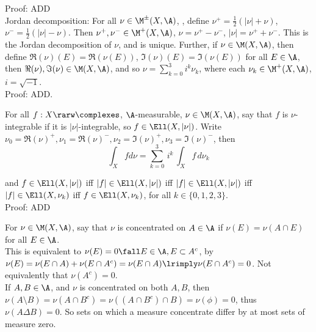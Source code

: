 \noindent
Proof: ADD \\

Jordan decomposition: For all $ \nu \in \M^\pm(X, \A)$, , define $\nu^+ = \frac{1}{2}(|\nu| + \nu)$, $\nu^- = \frac{1}{2}(|\nu| - \nu)$. Then $\nu^+, \nu^- \in  \M^+(X, \A)$, $\nu = \nu^+ - \nu^-$, $|\nu| = \nu^+ + \nu^-$. This is the Jordan decomposition of $\nu$, and is unique. Further, if $\nu \in \M(X, \A)$, then define $\Re(\nu)(E) = \Re(\nu(E))$, $\Im(\nu)(E) = \Im(\nu(E))$ for all $E \in \A$, then $\Re(\nu), \Im(\nu) \in \M(X, \A)$, and so $\nu = \sum_{k=0}^3 i^k \nu_k$, where each $\nu_k \in \M^+(X, \A)$, $i = \sqrt{-1}$.\\

\noindent
Proof: ADD.


For all $f:X \rarw \complexes$, $\A$-measurable, $\nu \in \M(X, \A)$, say that $f$ is $\nu$-integrable if it is $|\nu|$-integrable, so $f \in \Ell (X, |\nu|)$. Write $\nu_0 = \Re(\nu)^+, \nu_1 = \Re(\nu)^-, \nu_2 = \Im(\nu)^+, \nu_3 = \Im(\nu)^-$, then \\

$$
\int_X f d\nu = \sum_{k=0}^3 \, i^k \, \int_X f \, d\nu_k
$$

\noindent
and $f \in \Ell (X, |\nu|)$ iff $|f| \in \Ell (X, |\nu|)$ iff $|f| \in \Ell (X, |\nu|)$ iff $|f| \in \Ell (X, \nu_k)$ iff $f \in \Ell (X, \nu_k)$, for all $k \in \{0,1,2,3\}$. \\

\noindent
Proof: ADD \\





\break

For $\nu \in \M(X, \A)$, say that $\nu$ is concentrated on $A \in \A$ if $\nu(E) = \nu(A \cap E)$ for all $E \in \A$. \\

\noindent
This is equivalent to $\nu(E) = 0 \fall E \in \A, E \subset A^c$, by $\nu(E) = \nu(E \cap A) + \nu( E \cap A^c) = \nu(E \cap A) \lrimply \nu( E \cap A^c) = 0$.  Not equivalently that $\nu(A^c) = 0$. \\


\noindent
If $A,B \in \A$, and $\nu$ is concentrated on both $A,B$, then $\nu(A \setminus B) = \nu( A \cap B^c) = \nu( (A \cap B^c) \cap B ) = \nu( \phi ) = 0$, thus $\nu( A \Delta B) = 0$. So sets on which a measure concentrate differ by at most sets of measure zero. \\


